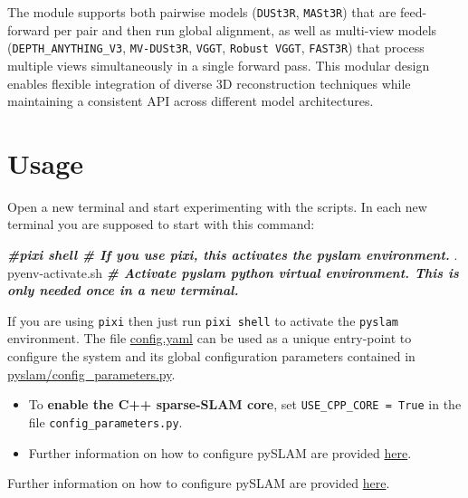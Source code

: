 \documentclass{article}
\newenvironment{Shaded}{\begin{snugshade}}{\end{snugshade}}
\newcommand{\BuiltInTok}[1]{\textcolor[rgb]{0.74,0.68,0.62}{#1}}
\newcommand{\CommentTok}[1]{\textcolor[rgb]{0.00,0.40,1.00}{\textbf{\textit{#1}}}}
\newcommand{\ExtensionTok}[1]{\textcolor[rgb]{0.74,0.68,0.62}{#1}}
\newcommand{\NormalTok}[1]{\textcolor[rgb]{0.74,0.68,0.62}{#1}}
\begin{document}
The module supports both pairwise models (\texttt{DUSt3R}\cite{wang2023dust3r}, \texttt{MASt3R}\cite{leroy2024grounding}) that are feed-forward per pair and then run global alignment, as well as multi-view models (\texttt{DEPTH\_ANYTHING\_V3}\cite{depthanything3}, \texttt{MV-DUSt3R}\cite{tang2025mv}, \texttt{VGGT}\cite{wang2025vggt}, \texttt{Robust VGGT}\cite{vggt_robust}, \texttt{FAST3R}\cite{yang2025fast3r}) that process multiple views simultaneously in a single forward pass. This modular design enables flexible integration of diverse 3D reconstruction techniques while maintaining a consistent API across different model architectures.

\FloatBarrier


\hypertarget{usage}{%
\section{Usage}\label{usage}}

Open a new terminal and start experimenting with the scripts. In each
new terminal you are supposed to start with this command:

\begin{scriptsize}
\begin{Shaded}
\begin{Highlighting}[]
\CommentTok{#pixi shell           # If you use pixi, this activates the pyslam environment. }
\NormalTok{ }\BuiltInTok{.} \ExtensionTok{pyenv-activate.sh}   \CommentTok{#  Activate pyslam python virtual environment. This is only needed once in a new terminal.}
\end{Highlighting}
\end{Shaded}
\end{scriptsize}

If you are using \texttt{pixi} then just run \texttt{pixi\ shell} to
activate the \texttt{pyslam} environment. The file \href{https://github.com/luigifreda/pyslam/blob/master/config.yaml}{config.yaml} can be used as a unique
entry-point to configure the system and its global configuration
parameters contained in
\href{https://github.com/luigifreda/pyslam/blob/master/pyslam/config_parameters.py}{pyslam/config\_parameters.py}. 
\begin{itemize}
\item To \textbf{enable the C++ sparse-SLAM core}, set \texttt{USE\_CPP\_CORE\ =\ True} in the file \texttt{config\_parameters.py}.
\item Further information on how to configure pySLAM are provided \protect\hyperlink{selecting-a-dataset-and-different-configuration-parameters}{here}.
\end{itemize}
Further
information on how to configure pySLAM are provided
\protect\hyperlink{selecting-a-dataset-and-different-configuration-parameters}{here}.
\end{document}
